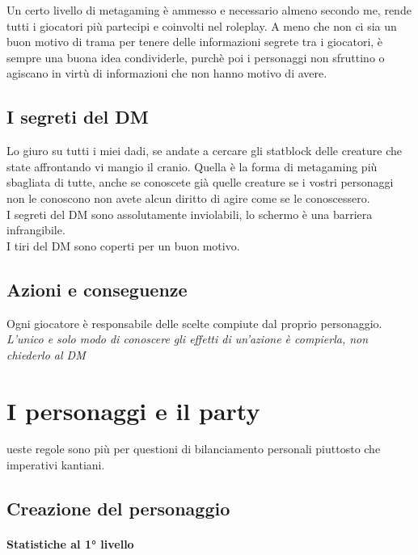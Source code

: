 Un certo livello di metagaming è ammesso e necessario almeno secondo me, rende tutti i giocatori più partecipi e coinvolti nel roleplay. A meno che non ci sia un buon motivo di trama per tenere delle informazioni segrete tra i giocatori, è sempre una buona idea condividerle, purchè poi i personaggi non sfruttino o agiscano in virtù di informazioni che non hanno motivo di avere.

\subsection{I segreti del DM}

Lo giuro su tutti i miei dadi, se andate a cercare gli statblock delle creature che state affrontando vi mangio il cranio. Quella è la forma di metagaming più sbagliata di tutte, anche se conoscete già quelle creature se i vostri personaggi non le conoscono non avete alcun diritto di agire come se le conoscessero.\\ I segreti del DM sono assolutamente inviolabili, lo schermo è una barriera infrangibile. \\ I tiri del DM sono coperti per un buon motivo.

\subsection{Azioni e conseguenze}

Ogni giocatore è responsabile delle scelte compiute dal proprio personaggio. \\ \textit{L'unico e solo modo di conoscere gli effetti di un'azione è compierla, non chiederlo al DM}

\section{I personaggi e il party}

ueste regole sono più per questioni di bilanciamento personali piuttosto che imperativi kantiani.

\subsection{Creazione del personaggio}

\paragraph{Statistiche al 1° livello}

